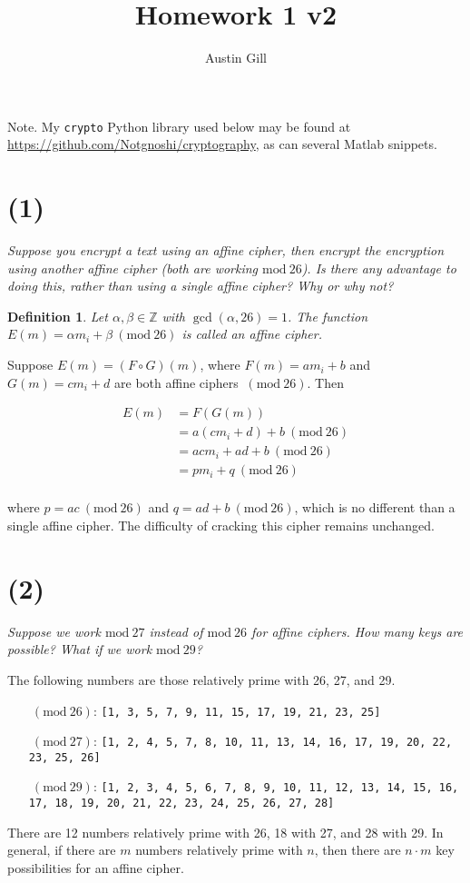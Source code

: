 \documentclass[12pt]{article}
\title{Homework 1 v2}
\author{Austin Gill}
\renewcommand{\mod}[1]{\mathrm{mod}\ #1}
\renewcommand{\pmod}[1]{\ (\mod{#1})}
\newtheorem*{defn}{Definition}
\begin{document}
\maketitle

Note. My \texttt{crypto} Python library used below may be found at \url{https://github.com/Notgnoshi/cryptography}, as can several Matlab snippets.
\section*{(1)} \textit{Suppose you encrypt a text using an affine cipher, then encrypt the encryption using another affine cipher (both are working $\mod{26}$). Is there any advantage to doing this, rather than using a single affine cipher? Why or why not?}

\begin{defn}
Let $\alpha , \beta \in \mathbb Z$ with $\gcd(\alpha , 26) = 1$. The function $E(m) = \alpha m_i + \beta \pmod{26}$ is called an affine cipher.
\end{defn}

Suppose $E(m) = (F \circ G)(m)$, where $F(m) = am_i + b$ and $G(m) = cm_i + d$ are both affine ciphers $\pmod{26}$. Then

\begin{align*}
    E(m) &= F(G(m))\\
         &= a(cm_i + d) + b \pmod{26}\\
         &= acm_i + ad + b \pmod{26}\\
         &= pm_i + q \pmod{26}\\
\end{align*}

where $p = ac \pmod{26}$ and $q = ad + b \pmod{26}$, which is no different than a single affine cipher. The difficulty of cracking this cipher remains unchanged.

\section*{(2)} \textit{Suppose we work $\mod{27}$ instead of $\mod{26}$ for affine ciphers. How many keys are possible? What if we work $\mod{29}$?}

The following numbers are those relatively prime with 26, 27, and 29.
\begin{itemize}
  \item[$\pmod{26}$:]
  \texttt{[1, 3, 5, 7, 9, 11, 15, 17, 19, 21, 23, 25]}
  \item[$\pmod{27}$:]
  \texttt{[1, 2, 4, 5, 7, 8, 10, 11, 13, 14, 16, 17, 19, 20, 22, 23, 25, 26]}
  \item[$\pmod{29}$:]
  \texttt{[1, 2, 3, 4, 5, 6, 7, 8, 9, 10, 11, 12, 13, 14, 15, 16, 17, 18, 19, 20, 21, 22, 23, 24, 25, 26, 27, 28]}
\end{itemize}
There are 12 numbers relatively prime with 26, 18 with 27, and 28 with 29. In general, if there are $m$ numbers relatively prime with $n$, then there are $n\cdot m$ key possibilities for an affine cipher.
\end{document}

